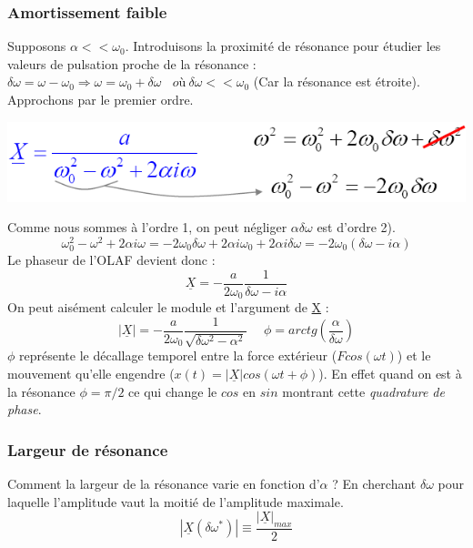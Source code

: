 \documentclass	[11pt, a4paper, openany]{book}
\begin{document}
\subsubsection{Amortissement faible}
Supposons $\alpha << \omega_0$. Introduisons la proximité de résonance pour étudier les valeurs de pulsation proche de la résonance : $\delta\omega = \omega - \omega_0 \Rightarrow \omega = \omega_0 + \delta\omega\ \ \ \ où\ \delta\omega << \omega_0$ (Car la résonance est étroite).\\
Approchons par le premier ordre.
\begin{center}
\includegraphics[scale=0.75]{oo/image17.png}
\end{center}
Comme nous sommes à l'ordre 1, on peut négliger $\alpha\delta\omega$ est d'ordre 2).
\begin{equation}
\omega_0^2 - \omega^2 + 2\alpha i \omega = -2\omega_0\delta\omega + 2\alpha i\omega_0 + 2 \alpha i\delta\omega =  -2\omega_0(\delta\omega - i\alpha)
\end{equation}
Le phaseur de l'OLAF devient donc :
\begin{equation}
\underline{X} = -\frac{a}{2\omega_0}\frac{1}{\delta\omega - i\alpha}
\end{equation}
On peut aisément calculer le module et l'argument de \underline{X} :
\begin{equation}
|\underline{X}| = -\frac{a}{2\omega_0}\frac{1}{\sqrt{\delta\omega^2 - \alpha^2}}\ \ \ \ \ \ \phi = arctg\left(\frac{\alpha}{\delta\omega}\right)
\end{equation}
$\phi$ représente le décallage temporel entre la force extérieur ($Fcos(\omega t)$) et le mouvement qu'elle engendre ($x(t) = |\underline{X}|cos(\omega t + \phi)$). En effet quand on est à la résonance $\phi = \pi/2$ ce qui change le $cos$ en $sin$ montrant cette \textit{quadrature de phase}.

\subsubsection{Largeur de résonance}
Comment la largeur de la résonance varie en fonction d'$\alpha$ ? En cherchant $\delta\omega$ pour laquelle l'amplitude vaut la moitié de l'amplitude maximale.
\begin{equation}
|\underline{X}(\delta\omega^*)| \equiv \frac{|\underline{X}|_{max}}{2}
\end{equation}
\end{document}

